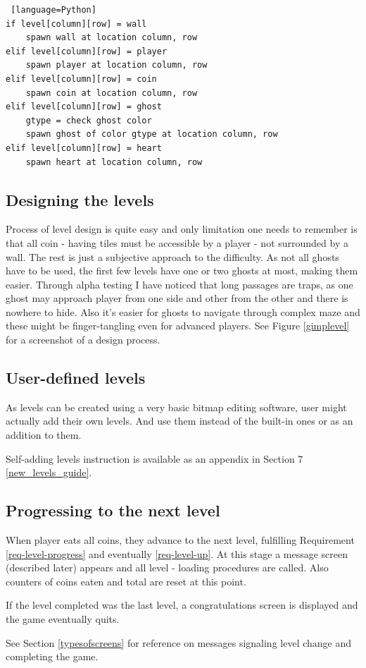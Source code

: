\documentclass[11pt,a4paper,notitlepage]{report}
\newcommand{\dsubsection}[1]{\FloatBarrier \subsection{#1}}
\begin{document}
				\begin{lstlisting} [language=Python]
if level[column][row] = wall
	spawn wall at location column, row
elif level[column][row] = player
	spawn player at location column, row
elif level[column][row] = coin
	spawn coin at location column, row
elif level[column][row] = ghost
	gtype = check ghost color
	spawn ghost of color gtype at location column, row
elif level[column][row] = heart
	spawn heart at location column, row
				\end{lstlisting}
			\dsubsection{Designing the levels}
				Process of level design is quite easy and only limitation one needs to remember is that all coin - having tiles must be accessible by a player - not surrounded by a wall. The rest is just a subjective approach to the difficulty. As not all ghosts have to be used, the first few levels have one or two ghosts at most, making them easier. Through alpha testing I have noticed that long passages are traps, as one ghost may approach player from one side and other from the other and there is nowhere to hide. Also it's easier for ghosts to navigate through complex maze and these might be finger-tangling even for advanced players.
				See Figure \ref{gimplevel} for a screenshot of a design process.
			\dsubsection{User-defined levels}
				As levels can be created using a very basic bitmap editing software, user might actually add their own levels. And use them instead of the built-in ones or as an addition to them.
				
				Self-adding levels instruction is available as an appendix in Section 7 \ref{new_levels_guide}.
			\dsubsection{Progressing to the next level}
				When player eats all coins, they advance to the next level, fulfilling Requirement \ref{req-level-progress} and eventually \ref{req-level-up}. At this stage a message screen (described later) appears and all level - loading procedures are called. Also counters of coins eaten and total are reset at this point.
				
				If the level completed was the last level, a congratulations screen is displayed and the game eventually quits.
				
				See Section \ref{typesofscreens} for reference on messages signaling level change and completing the game.
\end{document}
